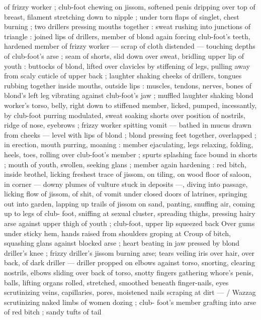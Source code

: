of frizzy worker ; club-foot chewing on jissom, softened penis 
dripping over top of breast, filament stretching down to nipple ; 
under torn flaps of singlet, chest burning ; two drillers pressing 
mouths together : sweat rushing into junctions of triangle : joined 
lips of drillers, member of blond again forcing club-foot's teeth, 
hardened member of frizzy worker --- scrap of cloth distended --- 
touching depths of club-foot's arse ; seam of shorts, slid down over 
sweat, bridling upper lip of youth : buttocks of blond, lifted over 
clavicles by stiffening of legs, pulling away from scaly cuticle of 
upper back ; laughter shaking cheeks of drillers, tongues rubbing 
together inside mouths, outside lips : muscles, tendons, nerves, 
bones of blond's left leg vibrating against club-foot's jaw ; muffled 
laughter shaking blond worker's torso, belly, right down to stiffened 
member, licked, pumped, incessantly, by club-foot purring 
modulated, sweat soaking shorts over position of nostrils, ridge of 
nose, eyebrows ; frizzy worker spitting vomit --- bathed in mucus 
drawn from cheeks --- level with lips of blond ; blond pressing feet 
together, overlapped ; in erection, mouth purring, moaning : member 
ejaculating, legs relaxing, folding, heels, toes, rolling over club-foot's 
member ; spurts splashing face bound in shorts ; mouth of youth, 
swollen, seeking glans ; member again hardening : red bitch, inside 
brothel, licking freshest trace of jissom, on tiling, on wood floor of 
saloon, in corner --- downy plumes of vulture stuck in deposits ---, 
diving into passage, licking flow of jissom, of shit, of vomit under 
closed doors of latrines, springing out into garden, lapping up trails 
of jissom on sand, panting, snuffing air, coming up to legs of club- 
foot, sniffing at sexual cluster, spreading thighs, pressing hairy arse 
against upper thigh of youth ; club-foot, upper lip squeezed back 
Over gums under sticky hem, hands raised from shoulders groping at 
Croup of bitch, squashing glans against blocked arse ; heart beating 
in jaw pressed by blond driller's knee ; frizzy driller's jissom burning 
arse; tears veiling iris over hair, over back, of dark driller --- driller 
propped on elbows against torso, snorting, clearing nostrils, elbows 
sliding over back of torso, snotty fingers gathering whore's penis, 
balls, lifting organs rolled, stretched, smoothed beneath finger-nails, 
eyes scrutinizing veins, capillaries, pores, moistened nails scraping 
at dirt --- {\slash} Wazzag scrutinizing naked limbs of women dozing ; club- 
foot's member grafting into arse of red bitch ; sandy tufts of tail 
